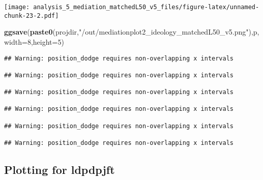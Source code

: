 \documentclass[
]{article}
\newenvironment{Shaded}{\begin{snugshade}}{\end{snugshade}}
\newcommand{\DataTypeTok}[1]{\textcolor[rgb]{0.13,0.29,0.53}{#1}}
\newcommand{\DecValTok}[1]{\textcolor[rgb]{0.00,0.00,0.81}{#1}}
\newcommand{\KeywordTok}[1]{\textcolor[rgb]{0.13,0.29,0.53}{\textbf{#1}}}
\newcommand{\NormalTok}[1]{#1}
\newcommand{\StringTok}[1]{\textcolor[rgb]{0.31,0.60,0.02}{#1}}
\begin{document}
\texttt{[image: analysis\_5\_mediation\_matchedL50\_v5\_files/figure-latex/unnamed-chunk-23-2.pdf]}

\begin{Shaded}
\begin{Highlighting}[]
\KeywordTok{ggsave}\NormalTok{(}\KeywordTok{paste0}\NormalTok{(projdir,}\StringTok{"/out/mediationplot2_ideology_matchedL50_v5.png"}\NormalTok{),p,}\DataTypeTok{width=}\DecValTok{8}\NormalTok{,}\DataTypeTok{height=}\DecValTok{5}\NormalTok{)}
\end{Highlighting}
\end{Shaded}

\begin{verbatim}
## Warning: position_dodge requires non-overlapping x intervals

## Warning: position_dodge requires non-overlapping x intervals

## Warning: position_dodge requires non-overlapping x intervals

## Warning: position_dodge requires non-overlapping x intervals

## Warning: position_dodge requires non-overlapping x intervals

## Warning: position_dodge requires non-overlapping x intervals
\end{verbatim}

\hypertarget{plotting-for-ldpdpjft}{%
\subsection{Plotting for ldpdpjft}\label{plotting-for-ldpdpjft}}
\end{document}
